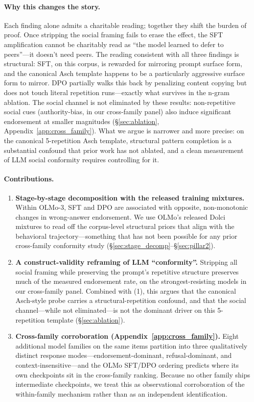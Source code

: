 \documentclass{article}
\begin{document}
\paragraph{Why this changes the story.}
Each finding alone admits a charitable reading; together they shift the burden of proof. Once stripping the social framing fails to erase the effect, the SFT amplification cannot be charitably read as ``the model learned to defer to peers''---it doesn't need peers. The reading consistent with all three findings is structural: SFT, on this corpus, is rewarded for mirroring prompt surface form, and the canonical Asch template happens to be a particularly aggressive surface form to mirror. DPO partially walks this back by penalizing content copying but does not touch literal repetition runs---exactly what survives in the n-gram ablation. The social channel is not eliminated by these results: non-repetitive social cues (authority-bias, in our cross-family panel) also induce significant endorsement at smaller magnitudes (\S\ref{sec:ablation}, Appendix~\ref{app:cross_family}). What we argue is narrower and more precise: on the canonical 5-repetition Asch template, structural pattern completion is a substantial confound that prior work has not ablated, and a clean measurement of LLM social conformity requires controlling for it.

\paragraph{Contributions.}
\begin{enumerate}
    \item \textbf{Stage-by-stage decomposition with the released training mixtures.} Within OLMo-3, SFT and DPO are associated with opposite, non-monotonic changes in wrong-answer endorsement. We use OLMo's released Dolci mixtures to read off the corpus-level structural priors that align with the behavioral trajectory---something that has not been possible for any prior cross-family conformity study (\S\ref{sec:stage_decomp}--\S\ref{sec:pillar2}).
    \item \textbf{A construct-validity reframing of LLM ``conformity''.} Stripping all social framing while preserving the prompt's repetitive structure preserves much of the measured endorsement rate, on the strongest-resisting models in our cross-family panel. Combined with (1), this argues that the canonical Asch-style probe carries a structural-repetition confound, and that the social channel---while not eliminated---is not the dominant driver on this 5-repetition template (\S\ref{sec:ablation}).
    \item \textbf{Cross-family corroboration (Appendix~\ref{app:cross_family}).} Eight additional model families on the same items partition into three qualitatively distinct response modes---endorsement-dominant, refusal-dominant, and context-insensitive---and the OLMo SFT/DPO ordering predicts where its own checkpoints sit in the cross-family ranking. Because no other family ships intermediate checkpoints, we treat this as observational corroboration of the within-family mechanism rather than as an independent identification.
\end{enumerate}
\end{document}
